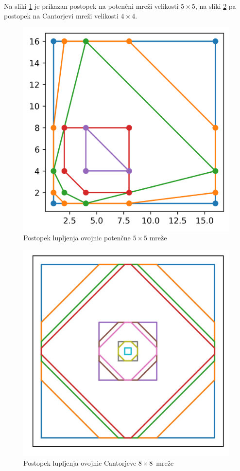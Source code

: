 \documentclass[a4paper]{article}
\begin{document}
\newpage
Na sliki \ref{fig:5x5} je prikazan postopek na potenčni mreži velikosti $5 \times 5$, na sliki \ref{fig:cantor} pa postopek na Cantorjevi mreži velikosti $4 \times 4$.

\begin{figure}[!h]
	\centering
	\caption{Postopek lupljenja ovojnic potenčne $5 \times 5$ mreže}
	\label{fig:5x5}
	\vspace{2mm}
	\includegraphics[scale=0.6]{slike/5x5_potencna.png}
\end{figure}

\begin{figure}[!h]
	\centering
	\caption{Postopek lupljenja ovojnic Cantorjeve $8 \times 8$~mreže}
	\label{fig:cantor}
	\vspace{2mm}
	\includegraphics[scale=0.6]{slike/kvazi_cantor.jpg}
\end{figure}
\end{document}

